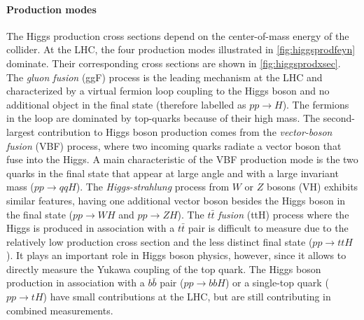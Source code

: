 \paragraph{Production modes} The Higgs production cross sections depend on the center-of-mass energy of the collider.
At the LHC, the four production modes illustrated in \cref{fig:higgsprodfeyn} dominate.
Their corresponding cross sections are shown in \cref{fig:higgsprodxsec}.
The \emph{gluon fusion} (ggF) process is the leading mechanism at the LHC and characterized by a virtual fermion loop coupling to the Higgs boson and no additional object in the final state (therefore labelled as $pp\rightarrow H$). 
The fermions in the loop are dominated by top-quarks because of their high mass. 
The second-largest contribution to Higgs boson production comes from the \emph{vector-boson fusion} (VBF) process, where two incoming quarks radiate a vector boson that fuse into the Higgs.
A main characteristic of the VBF production mode is the two quarks in the final state that appear at large angle and with a large invariant mass ($pp\rightarrow qqH$).
The \emph{Higgs-strahlung} process from $W$ or $Z$ bosons (VH) exhibits similar features, having one additional vector boson besides the Higgs boson in the final state ($pp \rightarrow WH$ and $pp \rightarrow ZH$).
The $t\bar{t}$ \emph{fusion} (ttH) process where the Higgs is produced in association with a $t\bar{t}$ pair is difficult to measure due to the relatively low production cross section and the less distinct final state ($pp \rightarrow ttH$). It plays an important role in Higgs boson physics, however, since it allows to directly measure the Yukawa coupling of the top quark. 
The Higgs boson production in association with a $b\bar{b}$ pair ($pp\rightarrow bbH$) or a single-top quark ($pp \rightarrow tH$) have small contributions at the LHC, but are still contributing in combined measurements.

